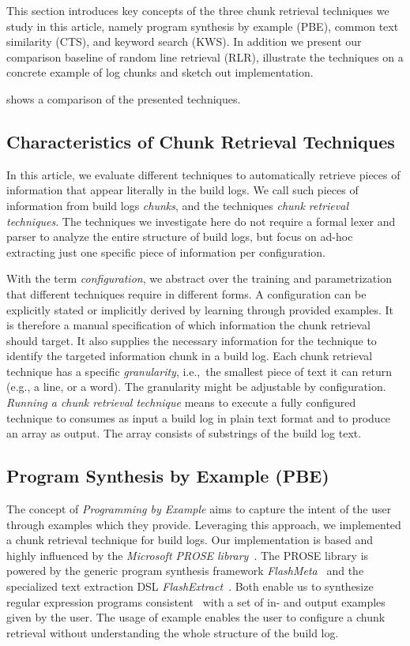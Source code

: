 This section introduces key concepts of the three chunk retrieval
techniques we study in this article, namely program synthesis by
example (PBE), common text similarity (CTS), and keyword search (KWS).
In addition we present our comparison baseline of random line
retrieval (RLR), illustrate the techniques on a concrete example
of log chunks and sketch out implementation.

 shows a comparison of the presented techniques.


\subsection{Characteristics of Chunk Retrieval Techniques}
\label{sec:crt-characteristics}
In this article, we evaluate different techniques to automatically
retrieve pieces of information that appear literally in the build
logs.
We call such pieces of information from build logs
\emph{chunks}, and the techniques \emph{chunk retrieval techniques}.
The techniques we investigate here do not require a formal lexer and
parser to analyze the entire structure of build logs, but focus on
ad-hoc extracting just one specific piece of information per
configuration.

With the term \textit{configuration}, we abstract over the training
and parametrization that different techniques require in different
forms.
A configuration can be explicitly stated or implicitly derived
by learning through provided examples.
It is therefore a manual
specification of which information the chunk retrieval should target.
It also supplies the necessary information for the technique to
identify the targeted information chunk in a build log.
Each chunk
retrieval technique has a specific \textit{granularity}, i.e.,\ the
smallest piece of text it can return (e.g., a line, or a word).
The
granularity might be adjustable by configuration.
\emph{Running a
chunk retrieval technique} means to execute a fully configured
technique to consumes as input a build log in plain text format and to
produce an array as output.
The array consists of substrings of the
build log text.

\subsection{Program Synthesis by Example (PBE)}
\label{sec:expl-pbe}
The concept of \emph{Programming by Example} aims to capture the
intent of the user through examples which they provide.
Leveraging this approach, we implemented a chunk retrieval technique
for build logs.
Our implementation is based and highly influenced by the
\emph{Microsoft PROSE library}~\cite{prose2019webpage}.
The PROSE library is powered by the generic program synthesis framework
\emph{FlashMeta}~\cite{polozov2015flashmeta:} and the specialized
text extraction DSL \emph{FlashExtract}~\cite{le2014flashextract:}.
Both enable us to synthesize regular expression programs
consistent~\cite{mitchell1982generalization} with a set of in-
and output examples given by the user.
The usage of example enables the user to configure a chunk
retrieval without understanding the whole structure of
the build log.

